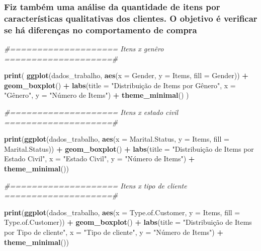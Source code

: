 \documentclass[
]{article}
\makeatletter
\newenvironment{Shaded}{\begin{snugshade}}{\end{snugshade}}
\newcommand{\AttributeTok}[1]{\textcolor[rgb]{0.13,0.29,0.53}{#1}}
\newcommand{\CommentTok}[1]{\textcolor[rgb]{0.56,0.35,0.01}{\textit{#1}}}
\newcommand{\FunctionTok}[1]{\textcolor[rgb]{0.13,0.29,0.53}{\textbf{#1}}}
\newcommand{\NormalTok}[1]{#1}
\newcommand{\SpecialCharTok}[1]{\textcolor[rgb]{0.81,0.36,0.00}{\textbf{#1}}}
\newcommand{\StringTok}[1]{\textcolor[rgb]{0.31,0.60,0.02}{#1}}
\newcommand*\pandocbounded[1]{%
  \sbox\pandoc@box{#1}%
  \Gscale@div\@tempa{\textheight}{\dimexpr\ht\pandoc@box+\dp\pandoc@box\relax}%
  \Gscale@div\@tempb{\linewidth}{\wd\pandoc@box}%
  \ifdim\@tempb\p@<\@tempa\p@\let\@tempa\@tempb\fi%
  \ifdim\@tempa\p@<\p@\scalebox{\@tempa}{\usebox\pandoc@box}%
  \else\usebox{\pandoc@box}%
  \fi%
}
\makeatother
\begin{document}
\pandocbounded{\texttt{[image: 7.png]}}
\pandocbounded{\texttt{[image: 8.png]}}

\subsubsection{Fiz também uma análise da quantidade de itens por
características qualitativas dos clientes. O objetivo é verificar se há
diferenças no comportamento de
compra}\label{fiz-tambuxe9m-uma-anuxe1lise-da-quantidade-de-itens-por-caracteruxedsticas-qualitativas-dos-clientes.-o-objetivo-uxe9-verificar-se-huxe1-diferenuxe7as-no-comportamento-de-compra}

\begin{Shaded}
\begin{Highlighting}[]

\CommentTok{\#==================== Itens x genêro ====================\#}

\FunctionTok{print}\NormalTok{(}
  \FunctionTok{ggplot}\NormalTok{(dados\_trabalho, }\FunctionTok{aes}\NormalTok{(}\AttributeTok{x =}\NormalTok{ Gender, }\AttributeTok{y =}\NormalTok{ Items, }\AttributeTok{fill =}\NormalTok{ Gender)) }\SpecialCharTok{+}
    \FunctionTok{geom\_boxplot}\NormalTok{() }\SpecialCharTok{+}
    \FunctionTok{labs}\NormalTok{(}\AttributeTok{title =} \StringTok{"Distribuição de Items por Gênero"}\NormalTok{, }\AttributeTok{x =} \StringTok{"Gênero"}\NormalTok{, }\AttributeTok{y =} \StringTok{"Número de Items"}\NormalTok{) }\SpecialCharTok{+}
    \FunctionTok{theme\_minimal}\NormalTok{()}
\NormalTok{)}

\CommentTok{\#==================== Itens x estado civil ====================\#}

\FunctionTok{print}\NormalTok{(}\FunctionTok{ggplot}\NormalTok{(dados\_trabalho, }\FunctionTok{aes}\NormalTok{(}\AttributeTok{x =}\NormalTok{ Marital.Status, }\AttributeTok{y =}\NormalTok{ Items, }\AttributeTok{fill =}\NormalTok{ Marital.Status)) }\SpecialCharTok{+}
  \FunctionTok{geom\_boxplot}\NormalTok{() }\SpecialCharTok{+}
  \FunctionTok{labs}\NormalTok{(}\AttributeTok{title =} \StringTok{"Distribuição de Items por Estado Civil"}\NormalTok{, }\AttributeTok{x =} \StringTok{"Estado Civil"}\NormalTok{, }\AttributeTok{y =} \StringTok{"Número de Items"}\NormalTok{) }\SpecialCharTok{+}
  \FunctionTok{theme\_minimal}\NormalTok{())}

\CommentTok{\#==================== Itens x tipo de cliente ====================\#}

\FunctionTok{print}\NormalTok{(}\FunctionTok{ggplot}\NormalTok{(dados\_trabalho, }\FunctionTok{aes}\NormalTok{(}\AttributeTok{x =}\NormalTok{ Type.of.Customer, }\AttributeTok{y =}\NormalTok{ Items, }\AttributeTok{fill =}\NormalTok{ Type.of.Customer)) }\SpecialCharTok{+}
  \FunctionTok{geom\_boxplot}\NormalTok{() }\SpecialCharTok{+}
  \FunctionTok{labs}\NormalTok{(}\AttributeTok{title =} \StringTok{"Distribuição de Items por Tipo de cliente"}\NormalTok{, }\AttributeTok{x =} \StringTok{"Tipo de cliente"}\NormalTok{, }\AttributeTok{y =} \StringTok{"Número de Items"}\NormalTok{) }\SpecialCharTok{+}
  \FunctionTok{theme\_minimal}\NormalTok{())}


\end{Highlighting}
\end{Shaded}
\end{document}

